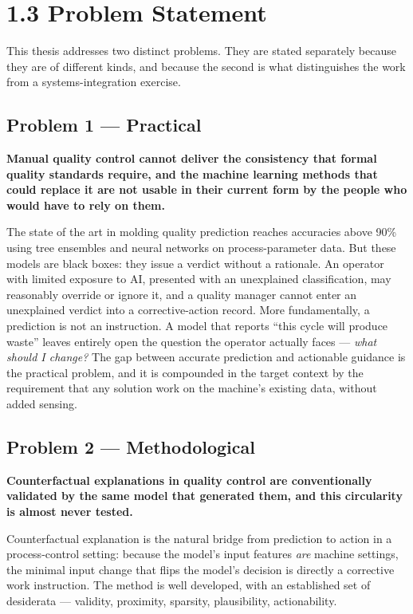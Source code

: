 \hypertarget{problem-statement}{%
\section{1.3 Problem Statement}\label{problem-statement}}

This thesis addresses two distinct problems. They are stated separately because they are of different kinds, and because the second is what distinguishes the work from a systems-integration exercise.

\hypertarget{problem-1-practical}{%
\subsection{Problem 1 --- Practical}\label{problem-1-practical}}

\textbf{Manual quality control cannot deliver the consistency that formal quality standards require, and the machine learning methods that could replace it are not usable in their current form by the people who would have to rely on them.}

The state of the art in molding quality prediction reaches accuracies above 90\% using tree ensembles and neural networks on process-parameter data. But these models are black boxes: they issue a verdict without a rationale. An operator with limited exposure to AI, presented with an unexplained classification, may reasonably override or ignore it, and a quality manager cannot enter an unexplained verdict into a corrective-action record. More fundamentally, a prediction is not an instruction. A model that reports ``this cycle will produce waste'' leaves entirely open the question the operator actually faces --- \emph{what should I change?} The gap between accurate prediction and actionable guidance is the practical problem, and it is compounded in the target context by the requirement that any solution work on the machine's existing data, without added sensing.

\hypertarget{problem-2-methodological}{%
\subsection{Problem 2 --- Methodological}\label{problem-2-methodological}}

\textbf{Counterfactual explanations in quality control are conventionally validated by the same model that generated them, and this circularity is almost never tested.}

Counterfactual explanation is the natural bridge from prediction to action in a process-control setting: because the model's input features \emph{are} machine settings, the minimal input change that flips the model's decision is directly a corrective work instruction. The method is well developed, with an established set of desiderata --- validity, proximity, sparsity, plausibility, actionability.

